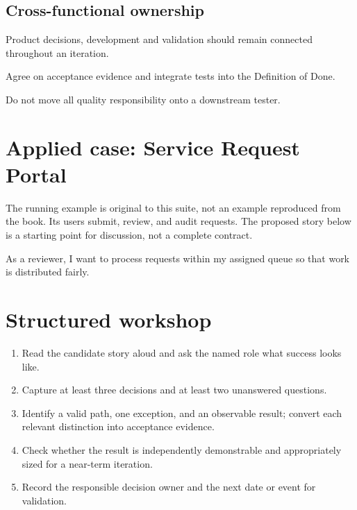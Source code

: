 \documentclass[11pt,letterpaper]{article}
\begin{document}
\subsection{Cross-functional ownership}
Product decisions, development and validation should remain connected throughout an iteration.

\begin{tcolorbox}[colback=tealback,colframe=navy,title={Engineering translation},breakable]
Agree on acceptance evidence and integrate tests into the Definition of Done.

\end{tcolorbox}
\begin{tcolorbox}[colback=amberback,colframe=navy,title={Failure mode to watch},breakable]
Do not move all quality responsibility onto a downstream tester.

\end{tcolorbox}
\section{Applied case: Service Request Portal}
The running example is original to this suite, not an example reproduced from the book. Its users submit, review, and audit requests. The proposed story below is a starting point for discussion, not a complete contract.

\begin{tcolorbox}[colback=blueback,colframe=navy,title={Candidate story},breakable]
As a reviewer, I want to process requests within my assigned queue so that work is distributed fairly.

\end{tcolorbox}
\section{Structured workshop}
\begin{enumerate}[leftmargin=*,itemsep=3pt]
\item Read the candidate story aloud and ask the named role what success looks like.
\item Capture at least three decisions and at least two unanswered questions.
\item Identify a valid path, one exception, and an observable result; convert each relevant distinction into acceptance evidence.
\item Check whether the result is independently demonstrable and appropriately sized for a near-term iteration.
\item Record the responsible decision owner and the next date or event for validation.
\end{enumerate}
\end{document}
